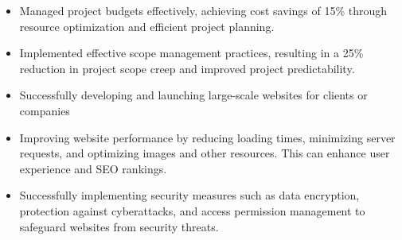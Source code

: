 \documentclass[10pt,a4paper,ragged2e,withhyper]{altacv}
\begin{document}
\begin{paracol}{2}
\begin{itemize}
\item Managed project budgets effectively, achieving cost savings of 15\% through resource optimization and efficient project planning.

\item Implemented effective scope management practices, resulting in a 25\% reduction in project scope creep and improved project predictability.
\end{itemize}


\begin{itemize}
\item Successfully developing and launching large-scale websites for clients or companies

\item Improving website performance by reducing loading times, minimizing server requests, and optimizing images and other resources. This can enhance user experience and SEO rankings.

\item Successfully implementing security measures such as data encryption, protection against cyberattacks, and access permission management to safeguard websites from security threats.
\end{itemize}







\end{paracol}
\end{document}
